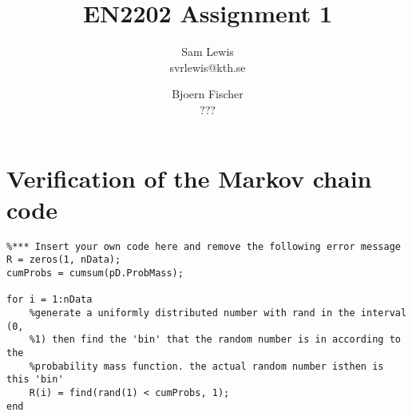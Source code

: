 \documentclass[11pt]{article}   %
\begin{document}
\setlength{\parindent}{0.00in}

\title{EN2202 Assignment 1}

\author{
 Sam Lewis\\
 svrlewis@kth.se
  \and
  Bjoern Fischer\\
  ???
}
\date{} 
\maketitle
\linespread{1.5}

\section{Verification of the Markov chain code}

\begin{lstlisting}
%*** Insert your own code here and remove the following error message 
R = zeros(1, nData);
cumProbs = cumsum(pD.ProbMass);

for i = 1:nData
    %generate a uniformly distributed number with rand in the interval (0,
    %1) then find the 'bin' that the random number is in according to the
    %probability mass function. the actual random number isthen is this 'bin'
    R(i) = find(rand(1) < cumProbs, 1); 
end
\end{lstlisting}\
\end{document}

